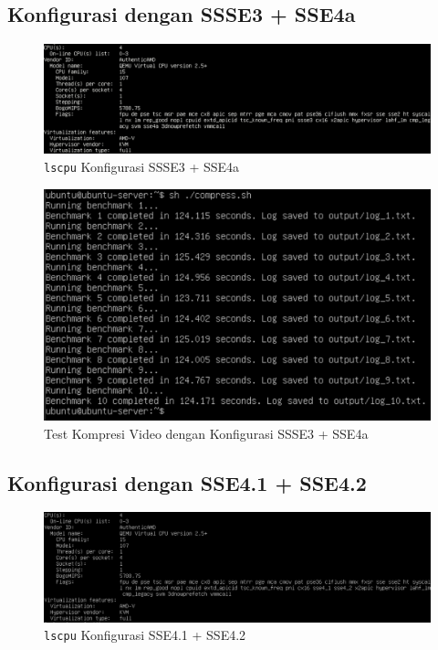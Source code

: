 \subsection{Konfigurasi dengan SSSE3 + SSE4a}
\begin{figure}
    \centering
    \includegraphics[width=1\textwidth]
    {assets/pics/video-compression-test/lscpu_ssse3,sse4a.jpeg}
    \caption{\texttt{lscpu} Konfigurasi SSSE3 + SSE4a}
    \label{fig:lscpu_video_compression_test_ssse3,sse4a}
\end{figure}

\begin{figure}
    \centering
    \includegraphics[width=1\textwidth]
    {assets/pics/video-compression-test/ssse3,sse4a.jpeg}
    \caption{Test Kompresi Video dengan Konfigurasi SSSE3 + SSE4a}
    \label{fig:video_compression_test_ssse3,sse4a}
\end{figure}

\subsection{Konfigurasi dengan SSE4.1 + SSE4.2}
\begin{figure}
    \centering
    \includegraphics[width=1\textwidth]
    {assets/pics/video-compression-test/lscpu_sse4.1,sse4.2.jpeg}
    \caption{\texttt{lscpu} Konfigurasi SSE4.1 + SSE4.2}
    \label{fig:lscpu_video_compression_test_sse4.1,sse4.2}
\end{figure}

